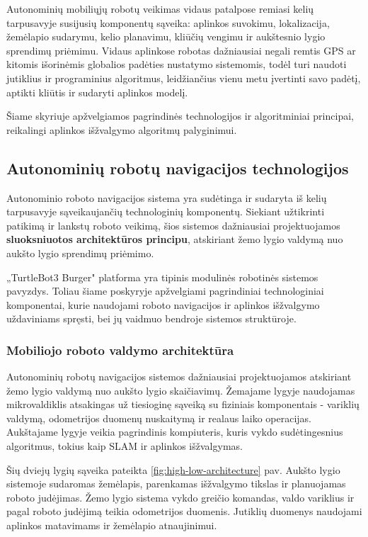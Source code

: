 \documentclass[]{VUMIFTemplateClass}
\begin{document}
Autonominių mobiliųjų robotų veikimas vidaus patalpose remiasi kelių tarpusavyje susijusių komponentų sąveika: aplinkos suvokimu, lokalizacija, žemėlapio
sudarymu, kelio planavimu, kliūčių vengimu ir aukštesnio lygio sprendimų priėmimu. Vidaus aplinkose robotas dažniausiai negali remtis GPS ar kitomis išorinėmis
globalios padėties nustatymo sistemomis, todėl turi naudoti jutiklius ir programinius algoritmus, leidžiančius vienu metu įvertinti savo padėtį, aptikti
kliūtis ir sudaryti aplinkos modelį.

Šiame skyriuje apžvelgiamos pagrindinės technologijos ir algoritminiai principai, reikalingi aplinkos išžvalgymo algoritmų palyginimui.

\subsection{Autonominių robotų navigacijos technologijos}
Autonominio roboto navigacijos sistema yra sudėtinga ir sudaryta iš kelių tarpusavyje sąveikaujančių technologinių komponentų. Siekiant užtikrinti patikimą ir lankstų roboto veikimą, šios sistemos dažniausiai projektuojamos \textbf{sluoksniuotos architektūros principu}, atskiriant žemo lygio valdymą nuo aukšto lygio sprendimų priėmimo.

„TurtleBot3 Burger" platforma \cite{Turtlebot3-overview, TURTLEBOT3-AS-EDUCATION-PLATFORM} yra tipinis modulinės robotinės sistemos pavyzdys. Toliau šiame poskyryje apžvelgiami pagrindiniai technologiniai komponentai, kurie naudojami roboto navigacijos ir aplinkos išžvalgymo uždaviniams spręsti, bei jų vaidmuo bendroje sistemos struktūroje.

\subsubsection{Mobiliojo roboto valdymo architektūra}

Autonominių robotų navigacijos sistemos dažniausiai projektuojamos atskiriant žemo lygio valdymą nuo aukšto lygio skaičiavimų. Žemajame lygyje naudojamas mikrovaldiklis atsakingas už tiesioginę sąveiką su fiziniais komponentais - variklių valdymą, odometrijos duomenų nuskaitymą ir realaus laiko operacijas. Aukštajame lygyje veikia pagrindinis kompiuteris, kuris vykdo sudėtingesnius algoritmus, tokius kaip SLAM ir aplinkos išžvalgymas.

Šių dviejų lygių sąveika pateikta \ref{fig:high-low-architecture} pav. Aukšto lygio sistemoje sudaromas žemėlapis, parenkamas išžvalgymo tikslas ir planuojamas
roboto judėjimas. Žemo lygio sistema vykdo greičio komandas, valdo variklius ir pagal roboto judėjimą teikia odometrijos duomenis. Jutiklių duomenys naudojami
aplinkos matavimams ir žemėlapio atnaujinimui.
\end{document}
